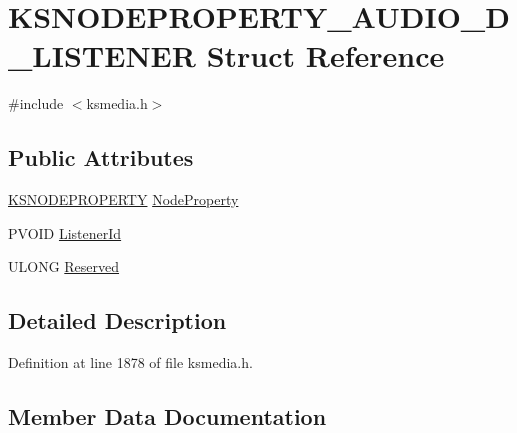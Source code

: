 \hypertarget{struct_k_s_n_o_d_e_p_r_o_p_e_r_t_y___a_u_d_i_o__3_d___l_i_s_t_e_n_e_r}{}\section{K\+S\+N\+O\+D\+E\+P\+R\+O\+P\+E\+R\+T\+Y\+\_\+\+A\+U\+D\+I\+O\+\_\+D\+\_\+\+L\+I\+S\+T\+E\+N\+ER Struct Reference}
\label{struct_k_s_n_o_d_e_p_r_o_p_e_r_t_y___a_u_d_i_o__3_d___l_i_s_t_e_n_e_r}


{\ttfamily \#include $<$ksmedia.\+h$>$}

\subsection*{Public Attributes}
\begin{DoxyCompactItemize}
\item 
\hyperlink{struct_k_s_n_o_d_e_p_r_o_p_e_r_t_y}{K\+S\+N\+O\+D\+E\+P\+R\+O\+P\+E\+R\+TY} \hyperlink{struct_k_s_n_o_d_e_p_r_o_p_e_r_t_y___a_u_d_i_o__3_d___l_i_s_t_e_n_e_r_a843a83ff9ca3f7cf23e3d4242ca54c0e}{Node\+Property}
\item 
P\+V\+O\+ID \hyperlink{struct_k_s_n_o_d_e_p_r_o_p_e_r_t_y___a_u_d_i_o__3_d___l_i_s_t_e_n_e_r_ab7afa79f8b37797d0b4f23acd8030f7d}{Listener\+Id}
\item 
U\+L\+O\+NG \hyperlink{struct_k_s_n_o_d_e_p_r_o_p_e_r_t_y___a_u_d_i_o__3_d___l_i_s_t_e_n_e_r_a181357e4b5e1c62403d29286f27e1b1e}{Reserved}
\end{DoxyCompactItemize}


\subsection{Detailed Description}


Definition at line 1878 of file ksmedia.\+h.



\subsection{Member Data Documentation}
